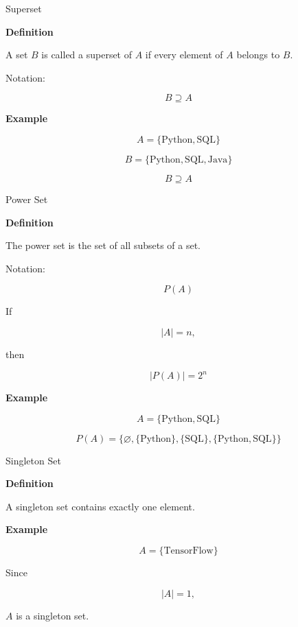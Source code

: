 \documentclass{beamer}
\begin{document}
\begin{frame}{Superset}

\small

\textbf{Definition}

A set $B$ is called a superset of $A$ if every element of $A$ belongs to $B$.

Notation:

\[
B\supseteq A
\]

\textbf{Example}

\[
A=\{\text{Python},\text{SQL}\}
\]

\[
B=\{\text{Python},\text{SQL},\text{Java}\}
\]

\[
B\supseteq A
\]

\end{frame}

\begin{frame}{Power Set}

\small

\textbf{Definition}

The power set is the set of all subsets of a set.

Notation:

\[
P(A)
\]

If

\[
|A|=n,
\]

then

\[
|P(A)|=2^n
\]

\textbf{Example}

\[
A=\{\text{Python},\text{SQL}\}
\]

\[
P(A)=
\{
\varnothing,
\{\text{Python}\},
\{\text{SQL}\},
\{\text{Python},\text{SQL}\}
\}
\]

\end{frame}

\begin{frame}{Singleton Set}

\small

\textbf{Definition}

A singleton set contains exactly one element.

\textbf{Example}

\[
A=\{\text{TensorFlow}\}
\]

Since

\[
|A|=1,
\]

$A$ is a singleton set.

\end{frame}
\end{document}
